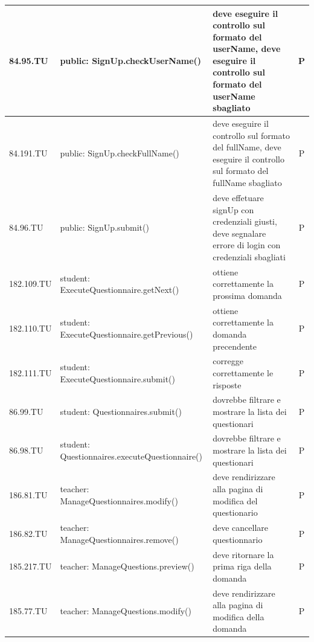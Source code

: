 \documentclass[12pt,a4paper]{article}
\begin{document}
\begin{center}
\begin{longtable}[H]{l p{} p{} c}
	84.95.TU& public: \newline  SignUp.checkUserName() & deve eseguire il controllo sul formato del userName, deve eseguire il controllo sul formato del userName sbagliato & P\\ \midrule
	84.191.TU& public: \newline  SignUp.checkFullName() & deve eseguire il controllo sul formato del fullName, deve eseguire il controllo sul formato del fullName sbagliato& P \\ \midrule
	84.96.TU& public: \newline  SignUp.submit() & deve effetuare signUp con credenziali giusti, deve segnalare errore di login con credenziali sbagliati & P\\ \midrule
	182.109.TU& student: \newline  ExecuteQuestionnaire.getNext() & ottiene correttamente la prossima domanda & P\\ \midrule
	182.110.TU& student: \newline  ExecuteQuestionnaire.getPrevious() & ottiene correttamente la domanda precendente & P\\ \midrule
	182.111.TU& student: \newline  ExecuteQuestionnaire.submit() & corregge correttamente le risposte & P\\ \midrule
	86.99.TU& student: \newline  Questionnaires.submit() & dovrebbe filtrare e mostrare la lista dei questionari & P \\ \midrule
	86.98.TU& student: \newline  Questionnaires.executeQuestionnaire() & dovrebbe filtrare e mostrare la lista dei questionari & P \\ \midrule
	186.81.TU& teacher: \newline  ManageQuestionnaires.modify() & deve rendirizzare alla pagina di modifica del questionario & P \\ \midrule
	186.82.TU& teacher: \newline  ManageQuestionnaires.remove() & deve cancellare questionnario & P\\ \midrule
	185.217.TU& teacher: \newline  ManageQuestions.preview() & deve ritornare la prima riga della domanda & P\\ \midrule
	185.77.TU& teacher: \newline  ManageQuestions.modify() & deve rendirizzare alla pagina di modifica della domanda & P\\ \midrule

\end{longtable}
\end{center}
\end{document}
